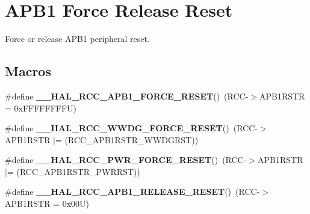 \hypertarget{group___r_c_c___a_p_b1___force___release___reset}{}\section{A\+P\+B1 Force Release Reset}
\label{group___r_c_c___a_p_b1___force___release___reset}


Force or release A\+P\+B1 peripheral reset.  


\subsection*{Macros}
\begin{DoxyCompactItemize}
\item 
\mbox{\label{group___r_c_c___a_p_b1___force___release___reset_ga6f6e7048eca1abd1be132027f5b79465}} 
\#define {\bfseries \+\_\+\+\_\+\+H\+A\+L\+\_\+\+R\+C\+C\+\_\+\+A\+P\+B1\+\_\+\+F\+O\+R\+C\+E\+\_\+\+R\+E\+S\+ET}()~(R\+CC-\/$>$A\+P\+B1\+R\+S\+TR = 0x\+F\+F\+F\+F\+F\+F\+F\+F\+U)
\item 
\mbox{\label{group___r_c_c___a_p_b1___force___release___reset_gaf60e74dcb0fdadafd6b4762aa81fc409}} 
\#define {\bfseries \+\_\+\+\_\+\+H\+A\+L\+\_\+\+R\+C\+C\+\_\+\+W\+W\+D\+G\+\_\+\+F\+O\+R\+C\+E\+\_\+\+R\+E\+S\+ET}()~(R\+CC-\/$>$A\+P\+B1\+R\+S\+TR $\vert$= (R\+C\+C\+\_\+\+A\+P\+B1\+R\+S\+T\+R\+\_\+\+W\+W\+D\+G\+R\+ST))
\item 
\mbox{\label{group___r_c_c___a_p_b1___force___release___reset_gaf454341fae45fdfacfea2f45c07ce3e0}} 
\#define {\bfseries \+\_\+\+\_\+\+H\+A\+L\+\_\+\+R\+C\+C\+\_\+\+P\+W\+R\+\_\+\+F\+O\+R\+C\+E\+\_\+\+R\+E\+S\+ET}()~(R\+CC-\/$>$A\+P\+B1\+R\+S\+TR $\vert$= (R\+C\+C\+\_\+\+A\+P\+B1\+R\+S\+T\+R\+\_\+\+P\+W\+R\+R\+ST))
\item 
\mbox{\label{group___r_c_c___a_p_b1___force___release___reset_ga9d0742ab271ace3dbe1a4e83de3d017b}} 
\#define {\bfseries \+\_\+\+\_\+\+H\+A\+L\+\_\+\+R\+C\+C\+\_\+\+A\+P\+B1\+\_\+\+R\+E\+L\+E\+A\+S\+E\+\_\+\+R\+E\+S\+ET}()~(R\+CC-\/$>$A\+P\+B1\+R\+S\+TR = 0x00\+U)
\item 
\mbox{\label{group___r_c_c___a_p_b1___force___release___reset_ga63fa37b173c2c1d9249389148f96e5f1}} 

\end{DoxyCompactItemize}
